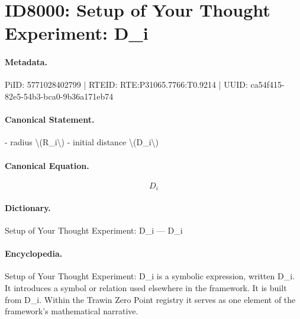 \section*{ID8000: Setup of Your Thought Experiment: D\_i}
\paragraph{Metadata.}
PiID: 5771028402799 | RTEID: RTE:P31065.7766:T0.9214 | UUID: ca54f415-82e5-54b3-bca0-9b36a171eb74

\paragraph{Canonical Statement.}
- radius \textbackslash{}(R\_i\textbackslash{}) - initial distance \textbackslash{}(D\_i\textbackslash{})

\paragraph{Canonical Equation.}
\[
D_i
\]

\paragraph{Dictionary.}
Setup of Your Thought Experiment: D\_i — D\_i

\paragraph{Encyclopedia.}
Setup of Your Thought Experiment: D\_i is a symbolic expression, written D\_i. It introduces a symbol or relation used elsewhere in the framework. It is built from D\_i. Within the Trawin Zero Point registry it serves as one element of the framework's mathematical narrative.
